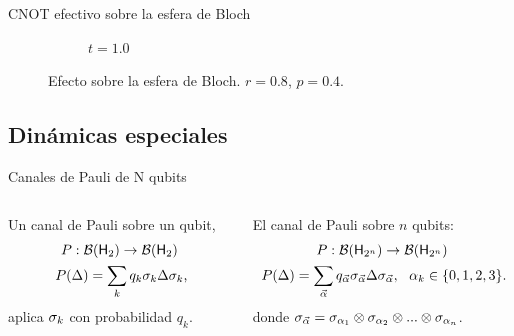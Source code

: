 \begin{frame}{CNOT efectivo sobre la esfera de Bloch}
\begin{figure}[h!]
\begin{subfigure}{0.32\textwidth}
            \caption{$t=1.0$}
        \end{subfigure}
        \caption{Efecto sobre la esfera de Bloch. $r=0.8$, $p=0.4$.}
    \end{figure}
\end{frame}


\subsection{Dinámicas especiales}

\begin{frame}{Canales de Pauli de N qubits}
    \begin{columns}
        \begin{column}{0.5\textwidth}
            Un canal de Pauli sobre un qubit,
            \begin{equation}
                \begin{gathered}
                P:\mcB(\hilbert_{2}) \rightarrow \mcB(\hilbert_{2})\nonumber\\
                P(\Delta)=\sum_{k}q_{k}\pauli{k}\Delta\pauli{k} \rlap{,}
                \end{gathered}
            \end{equation}
            aplica $\sigma_{k}$ con probabilidad $q_{k}$.
        \end{column}
        \pause
        \begin{column}{0.5\textwidth}
            El canal de Pauli sobre $n$ qubits:
            \begin{equation}
                \begin{gathered}
                P:\mcB(\hilbert_{2^{n}}) \rightarrow \mcB(\hilbert_{2^{n}})\nonumber\\
                P(\Delta)=\sum_{\vec{\alpha}}q_{\vec{\alpha}}\pauli{\vec{\alpha}}\Delta\pauli{\vec{\alpha}}, \,\text{ }\, \alpha_{k}\in\{0,1,2,3\} \rlap{.}
                \end{gathered}
            \end{equation}
            donde  $\sigma_{\vec{\alpha}}=\sigma_{\alpha_{1}}\otimes\sigma_{\alpha_{2}}\otimes...\otimes \sigma_{\alpha_{n}}$.
        \end{column}
    \end{columns}
\end{frame}


